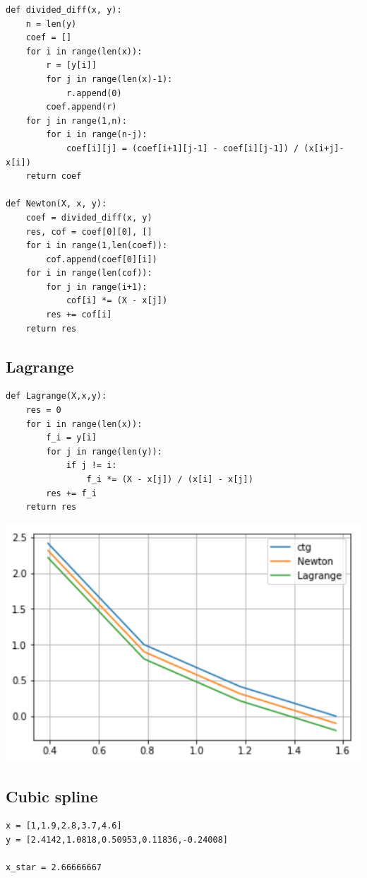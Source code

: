 \documentclass[pdf, unicode, 12pt, a4paper,oneside,fleqn]{article}
\begin{document}
\begin{lstlisting}
def divided_diff(x, y):
    n = len(y)
    coef = []
    for i in range(len(x)):
        r = [y[i]]
        for j in range(len(x)-1):
            r.append(0)
        coef.append(r)
    for j in range(1,n):
        for i in range(n-j):
            coef[i][j] = (coef[i+1][j-1] - coef[i][j-1]) / (x[i+j]-x[i])
    return coef
    
def Newton(X, x, y):
    coef = divided_diff(x, y)
    res, cof = coef[0][0], []
    for i in range(1,len(coef)):
        cof.append(coef[0][i])
    for i in range(len(cof)):
        for j in range(i+1):
            cof[i] *= (X - x[j])
        res += cof[i]
    return res
\end{lstlisting}

\subsection{Lagrange}

\begin{lstlisting}
def Lagrange(X,x,y):
    res = 0
    for i in range(len(x)):
        f_i = y[i]
        for j in range(len(y)):
            if j != i:
                f_i *= (X - x[j]) / (x[i] - x[j])
        res += f_i
    return res
\end{lstlisting}

\includegraphics[scale=0.5]{data1.png}

\subsection{Cubic spline}

\begin{lstlisting}
x = [1,1.9,2.8,3.7,4.6]
y = [2.4142,1.0818,0.50953,0.11836,-0.24008]

x_star = 2.66666667
\end{lstlisting}
\end{document}
